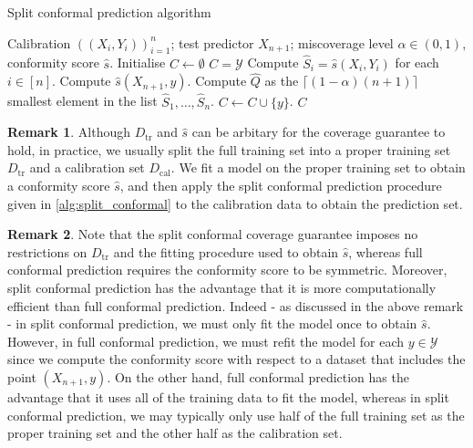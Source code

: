 \documentclass[11pt, titlepage]{article} %
\numberwithin{equation}{section}
\theoremstyle{definition}
\newtheorem{remark}{Remark}
\numberwithin{theorem}{section}
\numberwithin{lemma}{section}
\numberwithin{corollary}{section}
\numberwithin{proposition}{section}
\numberwithin{definition}{section}
\numberwithin{remark}{section}
\begin{document}
\begin{algorithm}[H]
\label{alg:split_conformal}
\caption{Split conformal prediction algorithm}
\begin{algorithmic}
    \Require Calibration \(((X_i, Y_i))_{i=1}^n\); test predictor \(X_{n+1}\); miscoverage level \(\alpha \in (0,1)\), conformity score \(\hat{s}\).
    \State Initialise \(C \gets \emptyset\)
        \State \(C = \mathcal{Y}\)
    \Else
        \State Compute \(\hat{S}_i = \hat{s}(X_i,Y_i)\) for each \(i \in [n]\).
            \State Compute \(\hat{s}(X_{n+1}, y)\).
            \State Compute \(\hat{Q}\) as the \(\lceil (1-\alpha)(n+1) \rceil \) smallest element in the list \(\hat{S}_1, \ldots, \hat{S}_n\).
                \State \(C \gets C \cup \{y\} \).
            \EndIf   
        \EndFor
    \EndIf
    \Ensure \(C\)
\end{algorithmic}
\end{algorithm}

\begin{remark}
    Although \(D_\mathrm{tr}\) and \(\hat{s}\) can be arbitary for the coverage guarantee to hold, in practice, we usually split the full training set into a proper training set \(D_\mathrm{tr}\) and a calibration set \(D_\mathrm{cal}\). We fit a model on the proper training set to obtain a conformity score \(\hat{s}\), and then apply the split conformal prediction procedure given in \cref{alg:split_conformal} to the calibration data to obtain the prediction set.
\end{remark}

\begin{remark}
    Note that the split conformal coverage guarantee imposes no restrictions on \(D_\mathrm{tr}\) and the fitting procedure used to obtain \(\hat{s}\), whereas full conformal prediction requires the conformity score to be symmetric. Moreover, split conformal prediction has the advantage that it is more computationally efficient than full conformal prediction. Indeed - as discussed in the above remark - in split conformal prediction, we must only fit the model once to obtain \(\hat{s}\). However, in full conformal prediction, we must refit the model for each \(y \in \mathcal{Y}\) since we compute the conformity score with respect to a dataset that includes the point \((X_{n+1}, y)\). On the other hand, full conformal prediction has the advantage that it uses all of the training data to fit the model, whereas in split conformal prediction, we may typically only use half of the full training set as the proper training set and the other half as the calibration set.
\end{remark}
\end{document}

